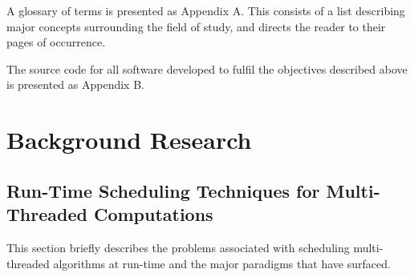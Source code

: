 A glossary of terms is presented as Appendix A. 
This consists of a list describing major concepts surrounding the field of study, and directs the reader to their pages of occurrence. 

The source code for all software developed to fulfil the objectives described above is presented as Appendix B.







\chapter{Background Research}

\section{Run-Time Scheduling Techniques for Multi-Threaded Computations}
This section briefly describes the problems associated with \gls{scheduling} \glspl{multi-threaded algorithm} at run-time and
the major paradigms that have surfaced.

